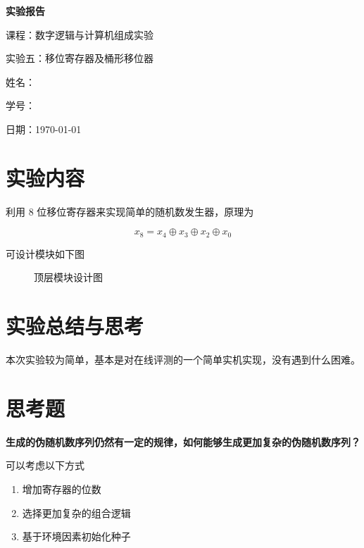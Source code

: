 \documentclass[12pt, a4paper]{ctexart}
\begin{document}
\begin{titlepage}
    \centering
    \vspace*{5cm}
    {\Huge\bfseries 实验报告\par}
    \vspace{2cm}
    {\Large 课程：数字逻辑与计算机组成实验\par}
    \vspace{1cm}
    {\Large 实验五：移位寄存器及桶形移位器\par}
    \vspace{4cm}
    {\large 姓名：\underline{}\par}
    \vspace{1cm}
    {\large 学号：\underline{}\par}
    \vspace{1cm}
    {\large 日期：\today\par}
\end{titlepage}

\tableofcontents
\newpage

\section{实验内容}

利用 8 位移位寄存器来实现简单的随机数发生器，原理为

\begin{equation}
    x_8=x_4\oplus x_3\oplus x_2\oplus x_0
\end{equation}

可设计模块如下图

\begin{figure}[H]
    \centering
    \caption{顶层模块设计图}
    \label{fig:top}
\end{figure}

\section{实验总结与思考}

本次实验较为简单，基本是对在线评测的一个简单实机实现，没有遇到什么困难。

\section{思考题}

\textbf{生成的伪随机数序列仍然有一定的规律，如何能够生成更加复杂的伪随机数序列？}

可以考虑以下方式

\begin{enumerate}
    \item 增加寄存器的位数
    \item 选择更加复杂的组合逻辑
    \item 基于环境因素初始化种子
\end{enumerate}
\end{document}
